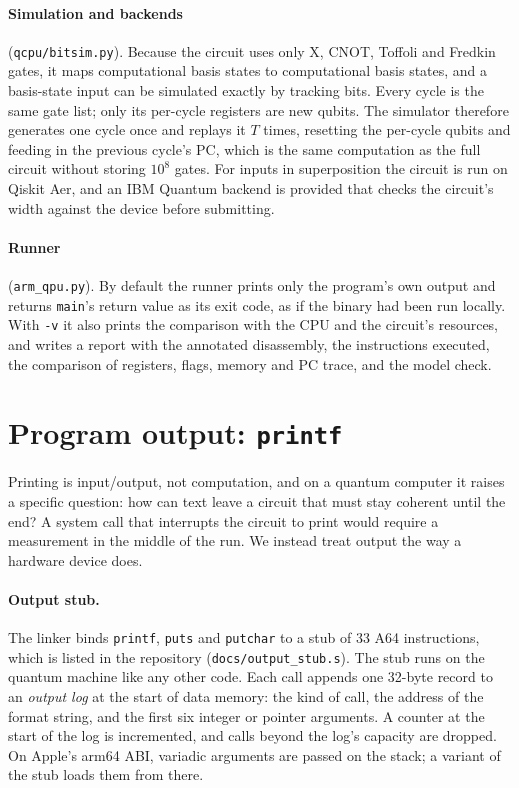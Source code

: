 \documentclass[11pt]{article}
\begin{document}
\paragraph{Simulation and backends} (\texttt{qcpu/bitsim.py}). Because the circuit uses only
X, CNOT, Toffoli and Fredkin gates, it maps computational basis states to computational basis
states, and a basis-state input can be simulated exactly by tracking bits. Every cycle is the
same gate list; only its per-cycle registers are new qubits. The simulator therefore
generates one cycle once and replays it $T$ times, resetting the per-cycle qubits and feeding
in the previous cycle's PC, which is the same computation as the full circuit without
storing $10^8$ gates. For inputs in superposition the circuit is run on Qiskit Aer, and an
IBM Quantum backend is provided that checks the circuit's width against the device before
submitting.

\paragraph{Runner} (\texttt{arm\_qpu.py}). By default the runner prints only the program's
own output and returns \texttt{main}'s return value as its exit code, as if the binary had
been run locally. With \texttt{-v} it also prints the comparison with the CPU and the
circuit's resources, and writes a report with the annotated disassembly, the instructions
executed, the comparison of registers, flags, memory and PC trace, and the model check.

\section{Program output: \texttt{printf}}
\label{sec:printf}

Printing is input/output, not computation, and on a quantum computer it raises a specific
question: how can text leave a circuit that must stay coherent until the end? A system call
that interrupts the circuit to print would require a measurement in the middle of the run.
We instead treat output the way a hardware device does.

\paragraph{Output stub.} The linker binds \texttt{printf}, \texttt{puts} and \texttt{putchar}
to a stub of 33 A64 instructions, which is listed in the repository
(\texttt{docs/output\_stub.s}). The stub runs on the quantum machine like any other code. Each
call appends one 32-byte record to an \emph{output log} at the start of data memory: the kind
of call, the address of the format string, and the first six integer or pointer arguments.
A counter at the start of the log is incremented, and calls beyond the log's capacity are
dropped. On Apple's arm64 ABI, variadic arguments are passed on the stack; a variant of the
stub loads them from there.
\end{document}
